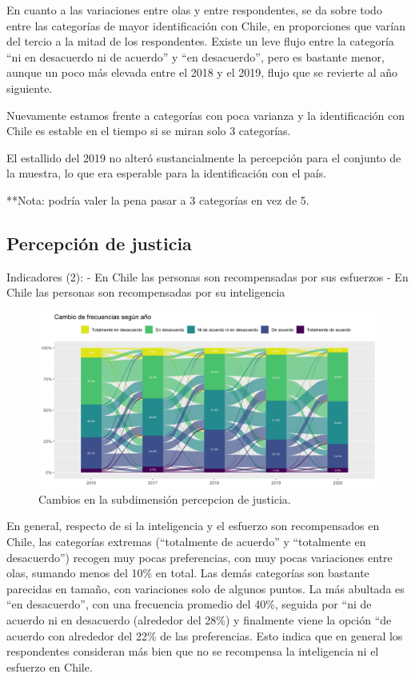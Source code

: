 \documentclass[
  12pt,
]{book}
\begin{document}
En cuanto a las variaciones entre olas y entre respondentes, se da sobre todo entre las categorías de mayor identificación con Chile, en proporciones que varían del tercio a la mitad de los respondentes. Existe un leve flujo entre la categoría ``ni en desacuerdo ni de acuerdo'' y ``en desacuerdo'', pero es bastante menor, aunque un poco más elevada entre el 2018 y el 2019, flujo que se revierte al año siguiente.

Nuevamente estamos frente a categorías con poca varianza y la identificación con Chile es estable en el tiempo si se miran solo 3 categorías.

El estallido del 2019 no alteró sustancialmente la percepción para el conjunto de la muestra, lo que era esperable para la identificación con el país.

**Nota: podría valer la pena pasar a 3 categorías en vez de 5.

\hypertarget{percepciuxf3n-de-justicia}{%
\subsection{Percepción de justicia}\label{percepciuxf3n-de-justicia}}

Indicadores (2):
- En Chile las personas son recompensadas por sus esfuerzos
- En Chile las personas son recompensadas por su inteligencia

\begin{figure}[H]

{\centering \includegraphics[width=1\linewidth,height=1\textheight]{output/graphs/alluvial_justicia} 

}

\caption{Cambios en la subdimensión percepcion de justicia.}\label{fig:alluvial-justicia}
\end{figure}

En general, respecto de si la inteligencia y el esfuerzo son recompensados en Chile, las categorías extremas (``totalmente de acuerdo'' y ``totalmente en desacuerdo'') recogen muy pocas preferencias, con muy pocas variaciones entre olas, sumando menos del 10\% en total. Las demás categorías son bastante parecidas en tamaño, con variaciones solo de algunos puntos. La más abultada es ``en desacuerdo'', con una frecuencia promedio del 40\%, seguida por ``ni de acuerdo ni en desacuerdo (alrededor del 28\%) y finalmente viene la opción ``de acuerdo con alrededor del 22\% de las preferencias. Esto indica que en general los respondentes consideran más bien que no se recompensa la inteligencia ni el esfuerzo en Chile.
\end{document}
